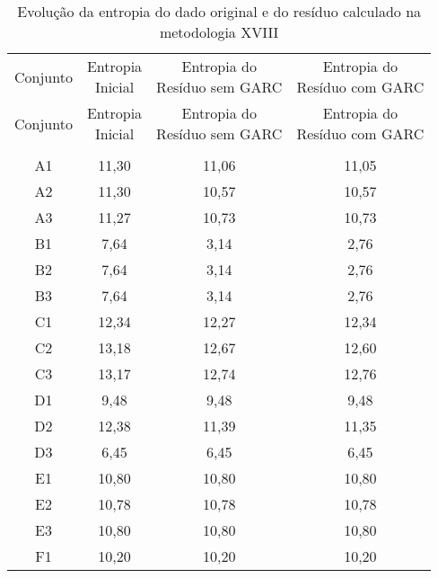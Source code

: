 \clearpage

\begin{center}
\begin{longtable}{cccc}
\toprule
\rowcolor{white}
\caption[Metodologia XVIII: evolução da entropia]{Evolução da entropia do dado
original e do resíduo calculado na metodologia XVIII}
\label{tab:EvolucaoEntropiaMet18}\\
\midrule
Conjunto & \specialcell{Entropia \\Inicial} & \specialcell{Entropia do
\\Resíduo sem GARC} & \specialcell{Entropia do
\\Resíduo com GARC}  \\
\midrule
\endfirsthead
\midrule
\rowcolor{white}
Conjunto & \specialcell{Entropia \\Inicial} & \specialcell{Entropia do
\\Resíduo sem GARC} & \specialcell{Entropia do
\\Resíduo com GARC}  \\
\toprule
\endhead
\midrule \\ %
\endfoot
\bottomrule 
\endlastfoot
    A1    & 11,30 & 11,06 & 11,05 \\
    A2    & 11,30 & 10,57 & 10,57 \\
    A3    & 11,27 & 10,73 & 10,73 \\
    B1    & 7,64  & 3,14  & 2,76 \\
    B2    & 7,64  & 3,14  & 2,76 \\
    B3    & 7,64  & 3,14  & 2,76 \\
    C1    & 12,34 & 12,27 & 12,34 \\
    C2    & 13,18 & 12,67 & 12,60 \\
    C3    & 13,17 & 12,74 & 12,76 \\
    D1    & 9,48  & 9,48  & 9,48 \\
    D2    & 12,38 & 11,39 & 11,35 \\
    D3    & 6,45  & 6,45  & 6,45 \\
    E1    & 10,80 & 10,80 & 10,80 \\
    E2    & 10,78 & 10,78 & 10,78 \\
    E3    & 10,80 & 10,80 & 10,80 \\
    F1    & 10,20 & 10,20 & 10,20 \\

\end{longtable}
\end{center}
